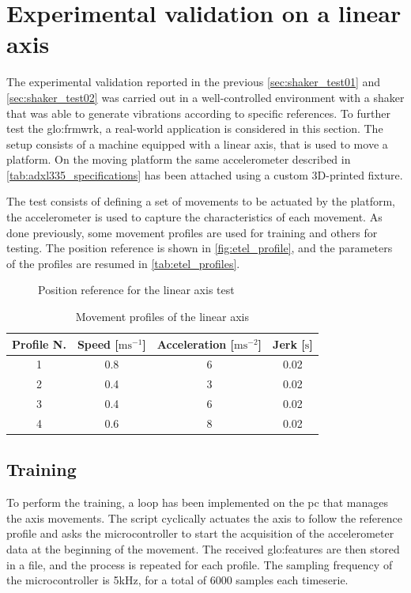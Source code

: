 \clearpage
\section{Experimental validation on a linear axis}
\label{sec:ExperimentalValidation}

The experimental validation reported in the previous \autoref{sec:shaker_test01} and \autoref{sec:shaker_test02} was carried out in a well-controlled environment with a shaker that was able to generate vibrations according to specific references. To further test the \gls{glo:frmwrk}, a real-world application is considered in this section. The setup consists of a machine equipped with a linear axis, that is used to move a platform. On the moving platform the same accelerometer described in \autoref{tab:adxl335_specifications} has been attached using a custom 3D-printed fixture.

The test consists of defining a set of movements to be actuated by the platform, the accelerometer is used to capture the characteristics of each movement. As done previously, some movement profiles are used for training and others for testing. The position reference is shown in \autoref{fig:etel_profile}, and the parameters of the profiles are resumed in \autoref{tab:etel_profiles}.

\begin{figure}
    \centering
    \todo%
    \caption{Position reference for the linear axis test}
    \label{fig:etel_profile}
\end{figure}

\begin{table}
    \centering
    \caption{Movement profiles of the linear axis}
    \label{tab:etel_profiles}
    \begin{tabular}{cccc} 
    \toprule
    \textbf{Profile N.} & \textbf{Speed} {[}$\text{m}\text{s}^{-1}$] & \textbf{Acceleration} {[}$\text{m}\text{s}^{-2}$] & \textbf{Jerk} {[}$\text{s}$] \\ 
    \hline
    1 & 0.8 & 6 & 0.02 \\
    2 & 0.4 & 3 & 0.02 \\
    3 & 0.4 & 6 & 0.02 \\
    4 & 0.6 & 8 & 0.02 \\
    \bottomrule
\end{tabular}
\end{table}

\subsection{Training}
To perform the training, a loop has been implemented on the \gls{pc} that manages the axis movements. The script cyclically actuates the axis to follow the reference profile and asks the microcontroller to start the acquisition of the accelerometer data at the beginning of the movement. The received \gls{glo:feature}s are then stored in a file, and the process is repeated for each profile. The sampling frequency of the microcontroller is 5kHz, for a total of 6000 samples each timeserie. 

